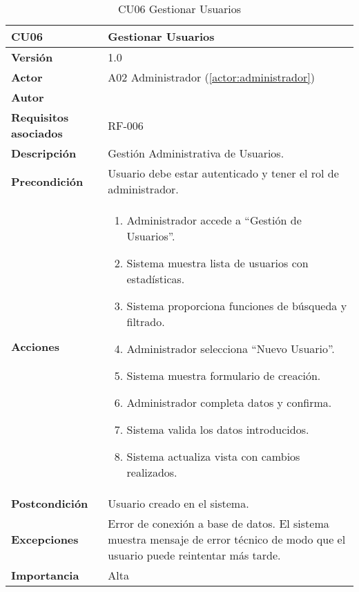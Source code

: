 \begin{table}[H]
	\centering
	\begin{tabularx}{\linewidth}{ p{} p{} }
		\toprule
		\textbf{CU06}    & \textbf{Gestionar Usuarios} \\
		\toprule
		\textbf{Versión}              & 1.0    \\
		\textbf{Actor}                & A02 Administrador (\ref{actor:administrador}) \\
		\textbf{Autor}                & \nombre \\
		\textbf{Requisitos asociados} & RF-006 \\
		\textbf{Descripción}          & Gestión Administrativa de Usuarios. \\
		\textbf{Precondición}         & Usuario debe estar autenticado y tener el rol de administrador. \\
		\textbf{Acciones}             &
		\begin{enumerate}
			\def\labelenumi{\arabic{enumi}.}
			\tightlist
			\item Administrador accede a ``Gestión de Usuarios''.
            \item Sistema muestra lista de usuarios con estadísticas.
            \item Sistema proporciona funciones de búsqueda y filtrado.
            \item Administrador selecciona ``Nuevo Usuario''.
 	    \item Sistema muestra formulario de creación.
            \item Administrador completa datos y confirma.
            \item Sistema valida los datos introducidos.
            \item Sistema actualiza vista con cambios realizados.
		\end{enumerate}\\
		\textbf{Postcondición}        & Usuario creado en el sistema.\\
		\textbf{Excepciones}          & Error de conexión a base de datos. El sistema muestra mensaje de error técnico de modo que el usuario puede reintentar más tarde.\\
		\textbf{Importancia}          & Alta \\
		\bottomrule
	\end{tabularx}
	\caption{CU06 Gestionar Usuarios}
	\label{cu:gestionar-usuarios}
\end{table}

